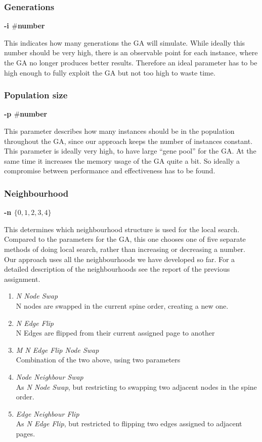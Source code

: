 \documentclass [11pt]{article}
\begin{document}
\subsubsection{Generations} \textbf{-i $\#$number} 

This indicates how many generations the GA will simulate. While ideally this number should be very high, there is an observable point for each instance, where the GA no longer produces better results. Therefore an ideal parameter has to be high enough to fully exploit the GA but not too high to waste time. 

\subsubsection{Population size} \textbf{-p $\#$number}

This parameter describes how many instances should be in the population throughout the GA, since our approach keeps the number of instances constant. This parameter is ideally very high, to have large ``gene pool'' for the GA. At the same time it increases the memory usage of the GA quite a bit. So ideally a compromise between performance and effectiveness has to be found. 

\subsubsection{ Neighbourhood} \textbf{-n $\{ 0,1,2,3,4\} $}

This determines which neighbourhood structure is used for the local search. Compared to the parameters for the GA, this one chooses one of five separate methods of doing local search, rather than increasing or decreasing a number. Our approach uses all the neighbourhoods we have developed so far. For a detailed description of the neighbourhoods see the report of the previous assignment.

\begin{enumerate}\addtocounter{enumi}{-1}
  \item \emph{N Node Swap} \\ 
  N nodes are swapped in the current spine order, creating a new one. 
  \item\emph{ N Edge Flip} \\ 
  N Edges are flipped from their current assigned page to another 
  \item \emph{M N Edge Flip Node Swap} \\
  Combination of the two above, using two parameters 
  \item \emph{Node Neighbour Swap }\\ 
  As \emph{N Node Swap}, but restricting to swapping two adjacent nodes in the spine order. 
  \item  \emph{Edge Neighbour Flip} \\
  As \emph{N Edge Flip}, but restricted to flipping two edges assigned to adjacent pages. 
\end{enumerate}
\end{document}
